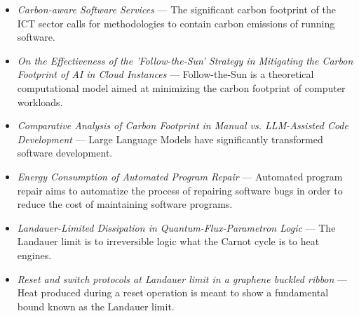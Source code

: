 \documentclass[11pt,a4paper]{article}
\providecommand{\textcite}[1]{\cite{#1}}
\begin{document}
\begin{itemize}[leftmargin=1.3em,itemsep=2pt]
\item \textcite{arxiv2405_12582} \emph{Carbon-aware Software Services} --- The significant carbon footprint of the ICT sector calls for methodologies to contain carbon emissions of running software.
\item \textcite{arxiv2506_10990} \emph{On the Effectiveness of the 'Follow-the-Sun' Strategy in Mitigating the Carbon Footprint of AI in Cloud Instances} --- Follow-the-Sun is a theoretical computational model aimed at minimizing the carbon footprint of computer workloads.
\item \textcite{arxiv2505_04521} \emph{Comparative Analysis of Carbon Footprint in Manual vs. LLM-Assisted Code Development} --- Large Language Models have significantly transformed software development.
\item \textcite{arxiv2211_12104} \emph{Energy Consumption of Automated Program Repair} --- Automated program repair aims to automatize the process of repairing software bugs in order to reduce the cost of maintaining software programs.
\item \textcite{arxiv2504_04284} \emph{Landauer-Limited Dissipation in Quantum-Flux-Parametron Logic} --- The Landauer limit is to irreversible logic what the Carnot cycle is to heat engines.
\item \textcite{arxiv1507_07450} \emph{Reset and switch protocols at Landauer limit in a graphene buckled ribbon} --- Heat produced during a reset operation is meant to show a fundamental bound known as the Landauer limit.
\end{itemize}
\end{document}
